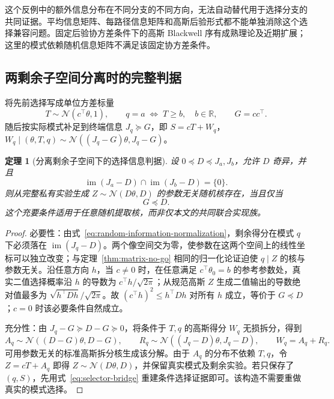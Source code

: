 \documentclass[UTF8,fontset=fandol,11pt,a4paper]{ctexart}
\newcommand{\R}{\mathbb R}
\newcommand{\N}{\mathcal N}
\newcommand{\im}{\operatorname{im}}
\newtheorem{theorem}{定理}[section]
\theoremstyle{definition}
\theoremstyle{remark}
\numberwithin{equation}{section}
\begin{document}
这个反例中的额外信息分布在不同分支的不同方向，无法自动替代用于选择分支的共同证据。平均信息矩阵、每路径信息矩阵和高斯后验形式都不能单独消除这个选择兼容问题。固定后验协方差条件下的高斯 Blackwell 序有成熟理论及近期扩展\cite{blackwell,kolchinsky}；这里的模式依赖随机信息矩阵不满足该固定协方差条件。

\subsection{两剩余子空间分离时的完整判据}
将先前选择写成单位方差标量
\begin{equation}
 T\sim\N(c^\top\theta,1),\qquad
 q=a\;\Longleftrightarrow\;T\ge b,\quad b\in\R,
 \qquad G=cc^\top.
\end{equation}
随后按实际模式补足到终端信息 $J_q\succeq G$，即 $S=cT+W_q$，
$W_q\mid(\theta,T,q)\sim\N((J_q-G)\theta,J_q-G)$。

\begin{theorem}[分离剩余子空间下的选择信息判据]
\label{thm:selector-floor}
设 $0\preceq D\preceq J_a,J_b$，允许 $D$ 奇异，并且
\begin{equation}
 \im(J_a-D)\cap\im(J_b-D)=\{0\}.
 \label{eq:disjoint-ranges}
\end{equation}
则从完整私有实验生成 $Z\sim\N(D\theta,D)$ 的参数无关随机核存在，当且仅当
\begin{equation}
 \boxed{G\preceq D.}
 \label{eq:selector-floor}
\end{equation}
这个充要条件适用于任意随机提取核，而非仅本文的共同联合实现族。
\end{theorem}

\begin{proof}
必要性：由式~\eqref{eq:random-information-normalization}，剩余得分在模式 $q$ 下必须落在 $\im(J_q-D)$。两个像空间交为零，使参数在这两个空间上的线性坐标可以独立改变；与定理~\ref{thm:matrix-no-go} 相同的归一化论证迫使 $q\mid Z$ 的核与参数无关。沿任意方向 $h$，当 $c\ne0$ 时，在任意满足 $c^\top\theta_0=b$ 的参考参数处，真实二值选择概率沿 $h$ 的导数为 $c^\top h/\sqrt{2\pi}$；从规范高斯 $Z$ 生成二值输出的导数绝对值最多为 $\sqrt{h^\top D h}/\sqrt{2\pi}$。故 $(c^\top h)^2\le h^\top D h$ 对所有 $h$ 成立，等价于 $G\preceq D$；$c=0$ 时该必要条件自然成立。

充分性：由 $J_q-G\succeq D-G\succeq0$，将条件于 $T,q$ 的高斯得分 $W_q$ 无损拆分，得到
\[
 A_q\sim\N((D-G)\theta,D-G),\qquad
 R_q\sim\N((J_q-D)\theta,J_q-D),\qquad W_q=A_q+R_q.
\]
可用参数无关的标准高斯拆分核生成该分解。由于 $A_q$ 的分布不依赖 $T,q$，令 $Z=cT+A_q$ 即得 $Z\sim\N(D\theta,D)$，并保留真实模式及剩余实验。若只保存了 $(q,S)$，先用式~\eqref{eq:selector-bridge} 重建条件选择证据即可。该构造不需要重做真实的模式选择。
\end{proof}
\end{document}
